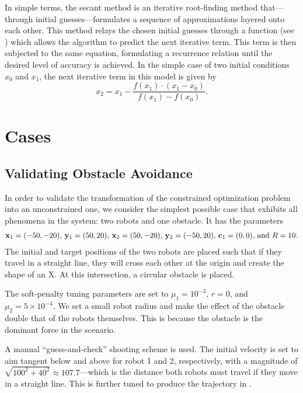 \documentclass[11pt]{article}
\begin{document}
In simple terms, the secant method is an iterative root-finding method that---through initial guesses---formulates a sequence of approximations layered onto each other. This method relays the chosen initial guesses through a function (see ) which allows the algorithm to predict the next iterative term. This term is then subjected to the same equation, formulating a recurrence relation until the desired level of accuracy is achieved. In the simple case of two initial conditions \(x_0\) and \(x_1\), the next iterative term in this model is given by 
\begin{equation}
	x_2 = x_1 - \frac{f(x_1) \cdot (x_1 - x_0)}{f(x_1) - f(x_0)}.
	\label{eq:secant}
\end{equation}

\section{Cases}

\subsection{Validating Obstacle Avoidance}

In order to validate the transformation of the constrained optimization problem into an unconstrained one, we consider the simplest possible case that exhibits all phenomena in the system: two robots and one obstacle. It has the parameters
\begin{align*}
	\mathbf{x}_1 = (-50,-20),\,\mathbf{y}_1 = (50,20),\,\mathbf{x}_2 = (50,-20),\,\mathbf{y}_2 = (-50,20),\,\mathbf{c}_1 = (0,0),\, \text{and } R = 10.
\end{align*}
The initial and target positions of the two robots are placed such that if they travel in a straight line, they will cross each other at the origin and create the shape of an X. At this intersection, a circular obstacle is placed.

The soft-penalty tuning parameters are set to \(\mu_1 = 10^{-3}\), \(r = 0\), and \(\mu_2 = 5 \times 10^{-4}\). We set a small robot radius and make the effect of the obstacle double that of the robots themselves. This is because the obstacle is the dominant force in the scenario.

A manual ``guess-and-check'' shooting scheme is used. The initial velocity is set to aim tangent below and above for robot 1 and 2, respectively, with a magnitude of \(\sqrt{100^2 + 40^2} \approx 107.7\)---which is the distance both robots must travel if they move in a straight line. This is further tuned to produce the trajectory in .
\end{document}
